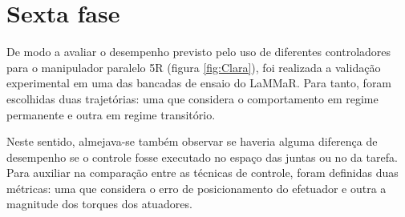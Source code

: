 \documentclass[]{politex}
\begin{document}
\section{Sexta fase} 
De modo a avaliar o desempenho previsto pelo uso de diferentes controladores para o manipulador paralelo 5R (figura \ref{fig:Clara}), foi realizada a validação experimental em uma das bancadas de ensaio do LaMMaR. Para tanto, foram escolhidas duas trajetórias: uma que considera o comportamento em regime permanente e outra em regime transitório. 

Neste sentido, almejava-se também observar se haveria alguma diferença de desempenho se o controle fosse executado no espaço das juntas ou no da tarefa. Para auxiliar na comparação entre as técnicas de controle, foram definidas duas métricas: uma que considera o erro de posicionamento do efetuador e outra a magnitude dos torques dos atuadores.



\end{document}
